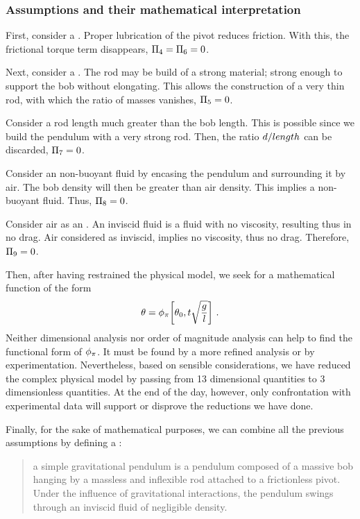 \subsubsection{Assumptions and their mathematical interpretation}\label{subsec:mathinterpretation}
First, consider a . Proper lubrication of the pivot reduces friction. With this, the frictional torque term disappears, $\Pi_4 = \Pi_6 = 0$.

Next, consider a . The rod may be build of a strong material; strong enough to support the bob without elongating. This allows the construction of a very thin rod, with which the ratio of masses vanishes, $\Pi_5 = 0$.

Consider a rod length much greater than the bob length. This is possible since we build the pendulum with a very strong rod. Then, the ratio $d/length$ can be discarded, $\Pi_7 = 0$.

Consider an non-buoyant fluid by encasing the pendulum and surrounding it by air. The bob density will then be greater than air density. This implies a non-buoyant fluid. Thus, $\Pi_8 = 0$.

Consider air as an . An inviscid fluid is a fluid with no viscosity, resulting thus in no drag. Air considered as inviscid, implies no viscosity, thus no drag. Therefore, $\Pi_9 = 0$.

Then, after having restrained the physical model, we seek for a mathematical function of the form
\begin{equation}\label{eq:simplegravpendulumdimanalysis}
\theta = \phi_{\pi}\!\left[{
            \theta_0, 
            t\sqrt{\dfrac{g}{l}}
            }\right]\,.
\end{equation}
Neither dimensional analysis nor order of magnitude analysis can help to find the functional form of $\phi_{\pi}$. It must be found by a more refined analysis or by experimentation. Nevertheless, based on sensible considerations, we have reduced the complex physical model by passing from 13 dimensional quantities to 3 dimensionless quantities. At the end of the day, however, only confrontation with experimental data will support or disprove the reductions we have done.

Finally, for the sake of mathematical purposes, we can combine all the previous assumptions by defining a :
\begin{quote}
a simple gravitational pendulum is a pendulum composed of a massive bob hanging by a massless and inflexible rod attached to a frictionless pivot. Under the influence of gravitational interactions, the pendulum swings through an inviscid fluid of negligible density.
\end{quote}


